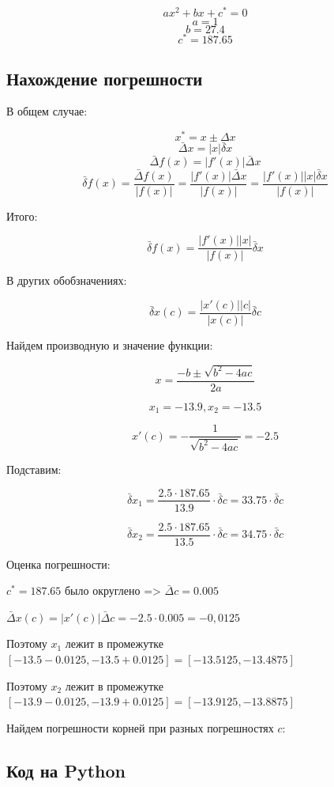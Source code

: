 \documentclass[a4paper,11pt]{article}
\theoremstyle{definition} %
\theoremstyle{remark} %
\begin{document}
$$a x^2+bx+c^* = 0$$
$$a = 1$$
$$b = 27.4$$
$$c^* = 187.65 $$

\subsection{Нахождение погрешности}

В общем случае:

$$x^* = x \pm \Delta x$$
$$\bar{\Delta} x = |x| \bar{\delta} x$$
$$\bar{\Delta} f(x) = |f'(x)| \bar{\Delta} x$$
$$ \bar{\delta} f(x) = \frac{\bar{\Delta} f(x)}{|f(x)|} = \frac{|f'(x)| \bar{\Delta} x}{|f(x)|} = \frac{|f'(x)| |x| \bar{\delta} x}{|f(x)|}$$

Итого:

$$ \bar{\delta} f(x) = \frac{|f'(x)| |x|}{|f(x)|} \bar{\delta} x$$

В других обобзначениях:

$$ \bar{\delta} x(c) = \frac{|x'(c)| |c|}{|x(c)|} \bar{\delta} c$$

Найдем производную и значение функции:

$$x = \frac{-b \pm \sqrt{b^2-4ac}}{2a} $$

$$x_1 = -13.9, x_2 = -13.5$$

$$x'(c) = -\frac{1}{\sqrt{b^2-4ac}} = -2.5$$

Подставим:

$$ \bar{\delta} x_1 = \frac{2.5 \cdot 187.65}{13.9} \cdot \bar{\delta} c = 33.75 \cdot \bar{\delta} c$$

$$ \bar{\delta} x_2 = \frac{2.5 \cdot 187.65}{13.5} \cdot \bar{\delta} c = 34.75 \cdot \bar{\delta} c$$

Оценка погрешности:

$c^* = 187.65$ было округлено => $\bar{\Delta} c = 0.005$ 




$\bar{\Delta} x(c) = |x'(c)| \bar{\Delta} c = -2.5 \cdot 0.005 = -0,0125$

Поэтому $x_1$ лежит в промежутке $[-13.5 - 0.0125, -13.5 + 0.0125] = [-13.5125, -13.4875]$

Поэтому $x_2$ лежит в промежутке $[-13.9 - 0.0125, -13.9 + 0.0125] = [-13.9125, -13.8875]$

Найдем погрешности корней при разных погрешностях $c$:

\subsection{Код на Python}
\end{document}
